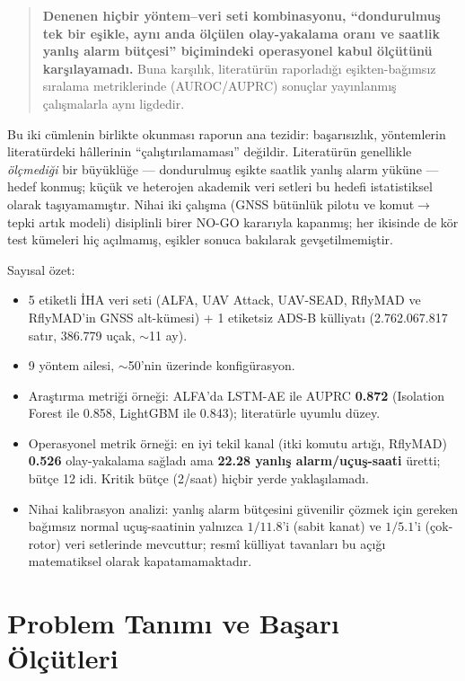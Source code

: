 \documentclass[11pt,a4paper]{article}
\begin{document}
\begin{quote}
\textbf{Denenen hiçbir yöntem--veri seti kombinasyonu, ``dondurulmuş tek bir
eşikle, aynı anda ölçülen olay-yakalama oranı ve saatlik yanlış alarm bütçesi''
biçimindeki operasyonel kabul ölçütünü karşılayamadı.} Buna karşılık,
literatürün raporladığı eşikten-bağımsız sıralama metriklerinde (AUROC/AUPRC)
sonuçlar yayınlanmış çalışmalarla aynı ligdedir.
\end{quote}

Bu iki cümlenin birlikte okunması raporun ana tezidir: başarısızlık, yöntemlerin
literatürdeki hâllerinin ``çalıştırılamaması'' değildir. Literatürün genellikle
\emph{ölçmediği} bir büyüklüğe --- dondurulmuş eşikte saatlik yanlış alarm
yüküne --- hedef konmuş; küçük ve heterojen akademik veri setleri bu hedefi
istatistiksel olarak taşıyamamıştır. Nihai iki çalışma (GNSS bütünlük pilotu ve
komut$\to$tepki artık modeli) disiplinli birer NO-GO kararıyla kapanmış; her
ikisinde de kör test kümeleri hiç açılmamış, eşikler sonuca bakılarak
gevşetilmemiştir.

Sayısal özet:

\begin{itemize}[itemsep=2pt]
  \item 5 etiketli İHA veri seti (ALFA, UAV Attack, UAV-SEAD, RflyMAD ve
        RflyMAD'in GNSS alt-kümesi) + 1 etiketsiz ADS-B külliyatı
        (2.762.067.817 satır, 386.779 uçak, $\sim$11 ay).
  \item 9 yöntem ailesi, $\sim$50'nin üzerinde konfigürasyon.
  \item Araştırma metriği örneği: ALFA'da LSTM-AE ile AUPRC \textbf{0.872}
        (Isolation Forest ile 0.858, LightGBM ile 0.843); literatürle uyumlu
        düzey.
  \item Operasyonel metrik örneği: en iyi tekil kanal (itki komutu artığı,
        RflyMAD) \textbf{0.526} olay-yakalama sağladı ama \textbf{22.28 yanlış
        alarm/uçuş-saati} üretti; bütçe 12 idi. Kritik bütçe (2/saat) hiçbir
        yerde yaklaşılamadı.
  \item Nihai kalibrasyon analizi: yanlış alarm bütçesini güvenilir çözmek için
        gereken bağımsız normal uçuş-saatinin yalnızca $1/11.8$'i (sabit kanat)
        ve $1/5.1$'i (çok-rotor) veri setlerinde mevcuttur; resmî külliyat
        tavanları bu açığı matematiksel olarak kapatamamaktadır.
\end{itemize}

\section{Problem Tanımı ve Başarı Ölçütleri}
\label{sec:olcut}
\end{document}
